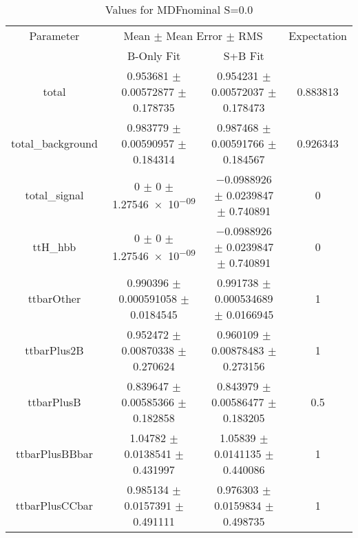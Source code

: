 \begin{table}
\centering
\caption{Values for MDFnominal S=0.0}
\begin{tabular}{cccc}
\toprule
Parameter & \multicolumn{2}{c}{Mean $\pm$ Mean Error $\pm$ RMS} & Expectation\\
 & B-Only Fit & S+B Fit & \\
\midrule
total & \num{0.953681} $\pm$ \num{0.00572877} $\pm$ \num{0.178735} & \num{0.954231} $\pm$ \num{0.00572037} $\pm$ \num{0.178473} & \num{0.883813}\\
total\_background & \num{0.983779} $\pm$ \num{0.00590957} $\pm$ \num{0.184314} & \num{0.987468} $\pm$ \num{0.00591766} $\pm$ \num{0.184567} & \num{0.926343}\\
total\_signal & \num{0} $\pm$ \num{0} $\pm$ \num{1.27546e-09} & \num{-0.0988926} $\pm$ \num{0.0239847} $\pm$ \num{0.740891} & \num{0}\\
ttH\_hbb & \num{0} $\pm$ \num{0} $\pm$ \num{1.27546e-09} & \num{-0.0988926} $\pm$ \num{0.0239847} $\pm$ \num{0.740891} & \num{0}\\
ttbarOther & \num{0.990396} $\pm$ \num{0.000591058} $\pm$ \num{0.0184545} & \num{0.991738} $\pm$ \num{0.000534689} $\pm$ \num{0.0166945} & \num{1}\\
ttbarPlus2B & \num{0.952472} $\pm$ \num{0.00870338} $\pm$ \num{0.270624} & \num{0.960109} $\pm$ \num{0.00878483} $\pm$ \num{0.273156} & \num{1}\\
ttbarPlusB & \num{0.839647} $\pm$ \num{0.00585366} $\pm$ \num{0.182858} & \num{0.843979} $\pm$ \num{0.00586477} $\pm$ \num{0.183205} & \num{0.5}\\
ttbarPlusBBbar & \num{1.04782} $\pm$ \num{0.0138541} $\pm$ \num{0.431997} & \num{1.05839} $\pm$ \num{0.0141135} $\pm$ \num{0.440086} & \num{1}\\
ttbarPlusCCbar & \num{0.985134} $\pm$ \num{0.0157391} $\pm$ \num{0.491111} & \num{0.976303} $\pm$ \num{0.0159834} $\pm$ \num{0.498735} & \num{1}\\
\bottomrule
\end{tabular}
\end{table}